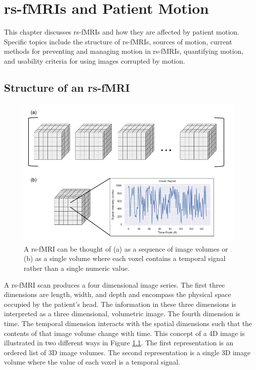 \chapter{rs-fMRIs and Patient Motion}
\label{ch:mri}

This chapter discusses rs-fMRIs and how they are affected by patient motion. Specific topics include the structure of rs-fMRIs, sources of motion, current methods for preventing and managing motion in rs-fMRIs, quantifying motion, and usability criteria for using images corrupted by motion.

\section{Structure of an rs-fMRI}

\begin{figure}
\centering
\includegraphics[width=.75\textwidth]{2/rsfMRI-views.png}
\caption{A rs-fMRI can be thought of (a) as a sequence of image volumes or (b) as a single volume where each voxel contains a temporal signal rather than a single numeric value.}
\label{ch2:fig:rsfmri-views}
\end{figure}

A rs-fMRI scan produces a four dimensional image series. The first three dimensions are length, width, and depth and encompass the physical space occupied by the patient's head. The information in these three dimensions is interpreted as a three dimensional, volumetric image. The fourth dimension is time. The temporal dimension interacts with the spatial dimensions such that the contents of that image volume change with time. This concept of a 4D image is illustrated in two different ways in Figure \ref{ch2:fig:rsfmri-views}. The first representation is an ordered list of 3D image volumes. The second representation is a single 3D image volume where the value of each voxel is a temporal signal. 

